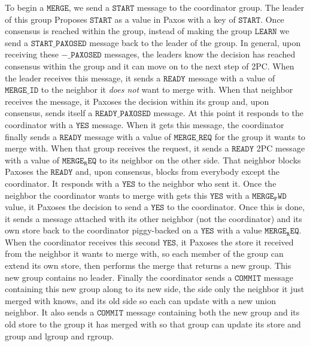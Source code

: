 \documentclass{amsart}
\theoremstyle{definition}
\theoremstyle{remark}
\numberwithin{equation}{section}
\begin{document}
To begin a $\mathtt{MERGE}$, we send a $\mathtt{START}$ message to the coordinator group. The leader of this group Proposes $\mathtt{START}$ as a value in Paxos with a key of $\mathtt{START}$. Once consensus is reached within the group, instead of making the group $\mathtt{LEARN}$ we send a $\mathtt{START\_PAXOSED}$ message back to the leader of the group. In general, upon receiving these $\mathtt{-\_PAXOSED}$ messages, the leaders know the decision has reached consensus within the group and it can move on to the next step of 2PC. When the leader receives this message, it sends a $\mathtt{READY}$ message with a value of $\mathtt{MERGE\_ID}$ to the neighbor it \textit{does not} want to merge with. When that neighbor receives the message, it Paxoses the decision within its group and, upon consensus, sends itself a $\mathtt{READY\_PAXOSED}$ message. 
At this point it responds to the coordinator with a $\mathtt{YES}$ message. When it gets this message, the coordinator finally sends a $\mathtt{READY}$ message with a value of $\mathtt{MERGE\_REQ}$ for the group it wants to merge with. When that group receives the request, it sends a $\mathtt{READY}$ 2PC message with a value of $\mathtt{MERGE_REQ}$ to its neighbor on the other side. That neighbor blocks Paxoses the $\mathtt{READY}$ and, upon consensus, blocks from everybody except the coordinator. It responds with a $\mathtt{YES}$ to the neighbor who sent it. Once the neighbor the coordinator wants to merge with gets this $\mathtt{YES}$ with a $\mathtt{MERGE_FWD}$ value, it Paxoses the decision to send a $\mathtt{YES}$ to the coordinator. Once this is done, it sends a message attached with its other neighbor (not the coordinator) and its own store back to the coordinator piggy-backed on a $\mathtt{YES}$ with a value $\mathtt{MERGE_REQ}$. When the coordinator receives this second $\mathtt{YES}$, it Paxoses the store it received from the neighbor it wants to merge with, so each member of the group can extend its own store, then performs the merge that returns a new group. This new group contains no leader. Finally the coordinator sends a $\mathtt{COMMIT}$ message containing this new group along to its new side, the side only the neighbor it just merged with knows, and its old side so each can update with a new union neighbor. It also sends a $\mathtt{COMMIT}$ message containing both the new group and its old store to the group it has merged with so that group can update its store and group and lgroup and rgroup. 
\end{document}
